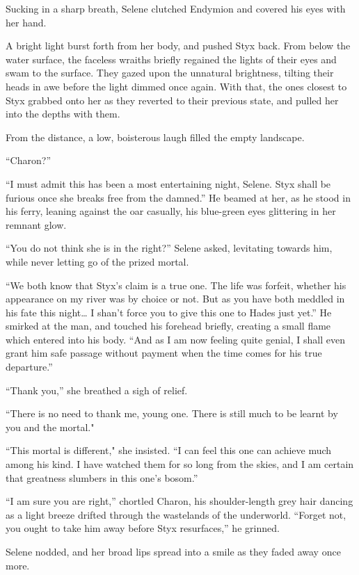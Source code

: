Sucking in a sharp breath, Selene clutched Endymion and covered his eyes with her hand.

A bright light burst forth from her body, and pushed Styx back. From below the water surface, the faceless wraiths briefly regained the lights of their eyes and swam to the surface. They gazed upon the unnatural brightness, tilting their heads in awe before the light dimmed once again. With that, the ones closest to Styx grabbed onto her as they reverted to their previous state, and pulled her into the depths with them.

From the distance, a low, boisterous laugh filled the empty landscape.

“Charon?”

“I must admit this has been a most entertaining night, Selene. Styx shall be furious once she breaks free from the damned.” He beamed at her, as he stood in his ferry, leaning against the oar casually, his blue-green eyes glittering in her remnant glow.

“You do not think she is in the right?” Selene asked, levitating towards him, while never letting go of the prized mortal.

“We both know that Styx's claim is a true one. The life was forfeit, whether his appearance on my river was by choice or not. But as you have both meddled in his fate this night… I shan’t force you to give this one to Hades just yet.” He smirked at the man, and touched his forehead briefly, creating a small flame which entered into his body. “And as I am now feeling quite genial, I shall even grant him safe passage without payment when the time comes for his true departure.”

“Thank you,” she breathed a sigh of relief.

``There is no need to thank me, young one. There is still much to be learnt by you and the mortal."

“This mortal is different," she insisted. ``I can feel this one can achieve much among his kind. I have watched them for so long from the skies, and I am certain that greatness slumbers in this one’s bosom.”

“I am sure you are right,” chortled Charon, his shoulder-length grey hair dancing as a light breeze drifted through the wastelands of the underworld. “Forget not, you ought to take him away before Styx resurfaces,” he grinned.

Selene nodded, and her broad lips spread into a smile as they faded away once more.

